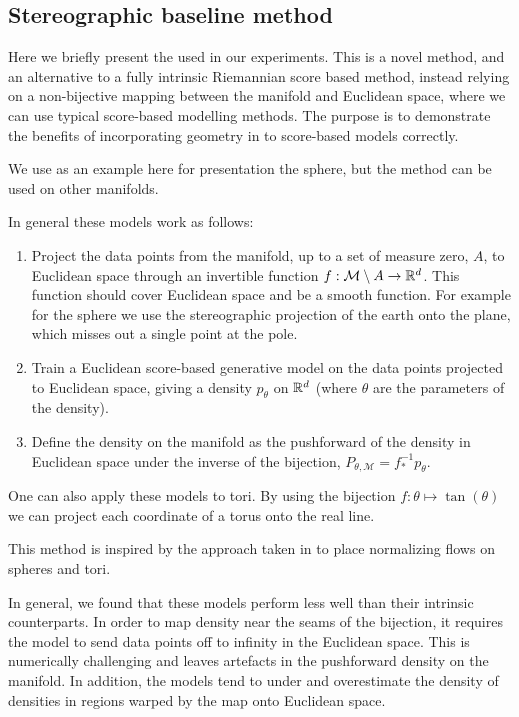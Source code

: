 \subsection{Stereographic baseline method}
\label{sec:stereo_exp}
Here we briefly present the  used in our experiments.
This is a novel method, and an alternative to a fully intrinsic Riemannian score based method, instead relying on a non-bijective mapping between the manifold and Euclidean space, where we can use typical score-based modelling methods.
The purpose is to demonstrate the benefits of incorporating geometry in to score-based models correctly.

We use as an example here for presentation the sphere, but the method can be used on other manifolds.

In general these models work as follows: 
\begin{enumerate} 
	\item Project the data points from the manifold, up to a set of measure zero, \(A\), to Euclidean space through an invertible function \(f: \mathcal{M}\setminus A\to \mathbb{R}^d\). This function should cover Euclidean space and be a smooth function. For example for the sphere we use the stereographic projection of the earth onto the plane, which misses out a single point at the pole.
	\item Train a Euclidean score-based generative model on the data points projected to Euclidean space, giving a density \(p_{\theta}\) on \(\mathbb{R}^d\) (where \(\theta\) are the parameters of the density).
	\item Define the density on the manifold as the pushforward of the density in Euclidean space under the inverse of the bijection, \(P_{\theta, \mathcal{M}} = f^{-1}_* p_{\theta}\).
\end{enumerate}

One can also apply these models to tori.
By using the bijection \(f: \theta \mapsto \tan(\theta)\) we can project each coordinate of a torus onto the real line.

This method is inspired by the approach taken in \textcite{gemici2016normalizing} to place normalizing flows on spheres and tori.

In general, we found that these models perform less well than their intrinsic counterparts.
In order to map density near the seams of the bijection, it requires the model to send data points off to infinity in the Euclidean space.
This is numerically challenging and leaves artefacts in the pushforward density on the manifold.
In addition, the models tend to under and overestimate the density of densities in regions warped by the map onto Euclidean space.

